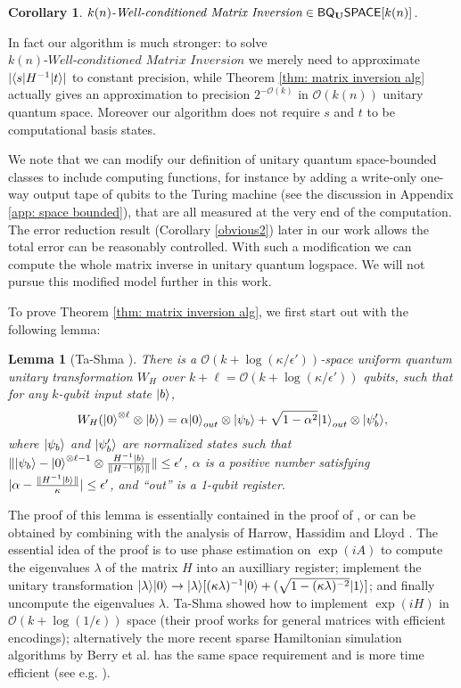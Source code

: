 \documentclass[11pt]{article}
\newtheorem{lemma}[theorem]{Lemma}
\newtheorem{corollary}[theorem]{Corollary}
\theoremstyle{definition}
\theoremstyle{remark}
\newcommand\matrixinvert[1]{{\ensuremath{#1}}\textit{-Well-conditioned Matrix Inversion}}
\newcommand{\classfont}{\sf}
\newcommand{\Unitary}{\mathbf{U}}
\newcommand{\unitaryBQSPACE}[1]{{\classfont{BQ}_\Unitary\classfont{SPACE}}[#1]}
\newcommand\bigoh{\mathcal{O}}
\newcommand{\wf}[1]{{\color{violet}{[{\bf wf:}#1]}}}
\begin{document}
\begin{corollary}
$\matrixinvert{k(n)} \in \unitaryBQSPACE{k(n)}$.
\end{corollary}
In fact our algorithm is much stronger: to solve $\matrixinvert{k(n)}$ we merely need to approximate $|{\left\langle{s}\right\vert}H^{-1}{\left\vert{t}\right\rangle}|$ to constant precision, while Theorem \ref{thm: matrix inversion alg} actually gives an approximation to precision $2^{-\bigoh (k)}$ in $\bigoh (k(n))$ unitary quantum space. Moreover our algorithm does not require $s$ and $t$ to be computational basis states.

We note that we can modify our definition of unitary quantum space-bounded classes to include computing functions, for instance by adding a write-only one-way output tape of qubits to the Turing machine (see the discussion in Appendix \ref{app: space bounded}), that are all measured at the very end of the computation. The error reduction result (Corollary \ref{obvious2}) later in our work allows the total error can be reasonably controlled. With such a modification we can compute the whole matrix inverse in unitary quantum logspace. We will not pursue this modified model further in this work.

To prove Theorem \ref{thm: matrix inversion alg}, we first start out with the following lemma:
\begin{lemma}[Ta-Shma \cite{tashma}] \label{lem: matrix inversion lemma}
There is a $\bigoh (k + \log(\kappa/\epsilon'))$-space uniform quantum unitary transformation $W_H$ over $k+\ell = \bigoh (k+ \log(\kappa/\epsilon'))$ qubits, such that for any $k$-qubit input state ${\left\vert{b}\right\rangle}$,
\begin{equation}
W_H ({\left\vert{0}\right\rangle}^{\otimes \ell} \otimes {\left\vert{b}\right\rangle}) = \alpha {\left\vert{0}\right\rangle}_{out} \otimes {\left\vert{\psi_b}\right\rangle} + \sqrt{1-\alpha^2} {\left\vert{1}\right\rangle}_{out} \otimes{\left\vert{\psi'_b}\right\rangle},
\end{equation}
where ${\left\vert{\psi_b}\right\rangle}$ and ${\left\vert{\psi'_b}\right\rangle}$ are normalized states such that $\| {\left\vert{\psi_b}\right\rangle} - {\left\vert{0}\right\rangle}^{\otimes \ell-1} \otimes \frac{H^{-1}{\left\vert{b}\right\rangle}} {\|H^{-1}{\left\vert{b}\right\rangle}\|} \| \le \epsilon'$, $\alpha$ is a positive number satisfying $|\alpha - \frac{\|H^{-1}{\left\vert{b}\right\rangle}\|}{\kappa}| \le \epsilon'$, and ``out'' is a 1-qubit register.
\end{lemma}
The proof of this lemma is essentially contained in the proof of \cite[Theorem~6.3]{tashma}, or can be obtained by combining \cite[Theorem~4.1]{tashma} with the analysis of Harrow, Hassidim and Lloyd \cite{HHL}. The essential idea of the proof is to use phase estimation on $\exp(iA)$ to compute the eigenvalues $\lambda$ of the matrix $H$ into an auxilliary register; implement the unitary transformation ${\left\vert{\lambda}\right\rangle}{\left\vert{0}\right\rangle} \rightarrow {\left\vert{\lambda}\right\rangle}[(\kappa\lambda)^{-1}{\left\vert{0}\right\rangle}+(\sqrt{1-(\kappa\lambda)^{-2}}{\left\vert{1}\right\rangle}]$; and finally uncompute the eigenvalues $\lambda$. Ta-Shma showed how to implement $\exp(iH)$ in $\bigoh (k+\log(1/\epsilon))$ space \cite[Theorem~4.1]{tashma} (their proof works for general matrices with efficient encodings); alternatively the more recent sparse Hamiltonian simulation algorithms by Berry et al. has the same space requirement and is more time efficient (see e.g. \cite{bccks15}).
\end{document}
